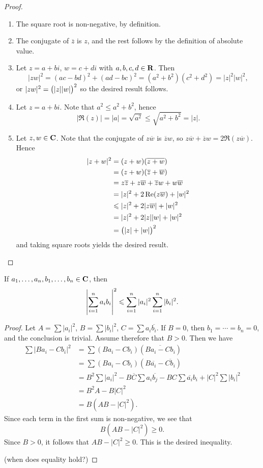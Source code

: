 \begin{proof} \
\begin{enumerate}[label=(\roman*)]
\item The square root is non-negative, by definition.
\item The conjugate of $\overline{z}$ is $z$, and the rest follows by the definition of absolute value.
\item Let $z=a+bi$, $w=c+di$ with $a,b,c,d\in\mathbf R$. Then
\[|zw|^2=(ac-bd)^2+(ad-bc)^2=(a^2+b^2)(c^2+d^2)=|z|^2|w|^2,\]
or $|zw|^2=\left(|z||w|\right)^2$ so the desired result follows.
\item Let $z=a+bi$. Note that $a^2\le a^2+b^2$, hence
\[|\Re(z)|=|a|=\sqrt{a^2}\le\sqrt{a^2+b^2}=|z|.\]
\item Let $z,w\in\mathbf C$. Note that the conjugate of $z\overline{w}$ is $\overline{z}w$, so $z\overline{w}+\overline{z}w=2\Re(z\overline{w})$. Hence
\begin{align*}
|z+w|^2&=(z+w)(\overline{z+w})\\
&=(z+w)(\overline{z}+\overline{w})\\
&=z\overline{z}+z\overline{w}+\overline{z}w+w\overline{w}\\
&=|z|^2+2\Re(z\overline{w})+|w|^2\\
&\leqslant|z|^2+2|z\overline{w}|+|w|^2\\
&=|z|^2+2|z||w|+|w|^2\\
&=\left(|z|+|w|\right)^2
\end{align*}
and taking square roots yields the desired result.
\end{enumerate}
\end{proof}

\begin{theorem}
If $a_1,\dots,a_n,b_1,\dots,b_n\in\mathbf C$, then
\begin{equation}
\left|\sum_{i=1}^{n}a_ib_i\right|^2\leqslant\sum_{i=1}^{n}|a_i|^2\sum_{i=1}^{n}|b_i|^2.
\end{equation}
\end{theorem}

\begin{proof}
Let $A=\sum|a_i|^2$, $B=\sum|b_i|^2$, $C=\sum a_i\overline{b_i}$. If $B=0$, then $b_1=\cdots=b_n=0$, and the conclusion is trivial. Assume therefore that $B>0$. Then we have
\begin{align*}
\sum|Ba_i-Cb_i|^2
&=\sum(Ba_i-Cb_i)(\overline{Ba_i-Cb_i})\\
&=\sum(Ba_i-Cb_i)(B\overline{a_i}-\overline{Cb_i})\\
&=B^2\sum|a_i|^2-B\overline{C}\sum a_i\overline{b_j}-BC\sum\overline{a_i}b_i+|C|^2\sum|b_i|^2\\
&=B^2A-B|C|^2\\
&=B(AB-|C|^2).
\end{align*}
Since each term in the first sum is non-negative, we see that
\[B(AB-|C|^2)\ge0.\]
Since $B>0$, it follows that $AB-|C|^2\ge0$. This is the desired inequality.

(when does equality hold?)
\end{proof}
\pagebreak


